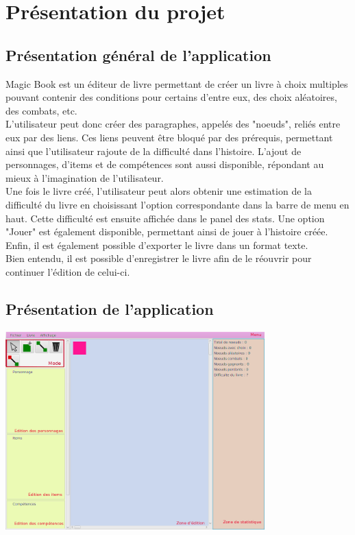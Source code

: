 \chapter{Présentation du projet}

	\section{Présentation général de l'application}
        Magic Book est un éditeur de livre permettant de créer un livre à choix multiples pouvant contenir des conditions pour certains d'entre eux, des choix aléatoires, des combats, etc.\\
        L'utilisateur peut donc créer des paragraphes, appelés des "noeuds", reliés entre eux par des liens. Ces liens peuvent être bloqué par des prérequis, permettant ainsi que l'utilisateur rajoute de la difficulté dans l'histoire. L'ajout de personnages, d'items et de compétences sont aussi disponible, répondant au mieux à l'imagination de l'utilisateur.\\
        Une fois le livre créé, l'utilisateur peut alors obtenir une estimation de la difficulté du livre en choisissant l'option correspondante dans la barre de menu en haut. Cette difficulté est ensuite affichée dans le panel des stats. Une option "Jouer" est également disponible, permettant ainsi de jouer à l'histoire créée. Enfin, il est également possible d'exporter le livre dans un format texte.\\
        Bien entendu, il est possible d'enregistrer le livre afin de le réouvrir pour continuer l'édition de celui-ci.\\

	\section{Présentation de l'application}

		\begin{center}
			\includegraphics[width=10cm]{img/magicBook.png}
		\end{center}


